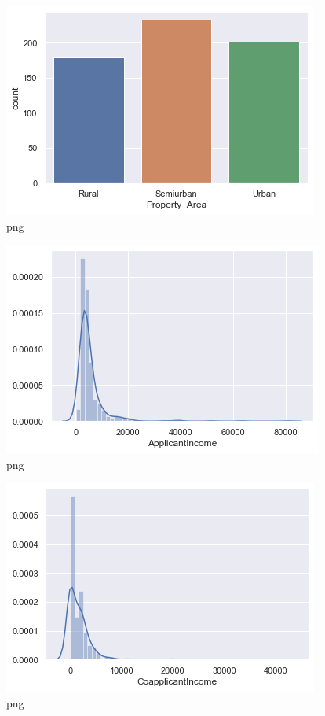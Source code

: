 \documentclass[]{article}
\begin{document}
\begin{figure}
\centering
\includegraphics{notebook_files/notebook_21_5.png}
\caption{png}
\end{figure}

\begin{figure}
\centering
\includegraphics{notebook_files/notebook_21_6.png}
\caption{png}
\end{figure}

\begin{figure}
\centering
\includegraphics{notebook_files/notebook_21_7.png}
\caption{png}
\end{figure}
\end{document}
